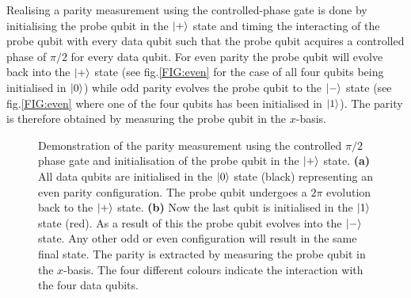 Realising a parity measurement using the controlled-phase gate is done by initialising the probe qubit in the $\ket{+}$ state and timing the interacting of the probe qubit with every data qubit such that the probe qubit acquires a controlled phase of $\pi/2$ for every data qubit. For even parity the probe qubit will evolve back into the $\ket{+}$ state (see fig.\@ \ref{FIG:even} for the case of all four qubits being initialised in $\ket{0}$) while odd parity evolves the probe qubit to the $\ket{-}$ state (see fig.\@ \ref{FIG:even} where one of the four qubits has been initialised in $\ket{1}$). The parity is therefore obtained by measuring the probe qubit in the $x$-basis.    


\begin{figure}[H]
	\caption[oddeven]{Demonstration of the parity measurement using the controlled  $\pi/2$ phase gate and initialisation of the probe qubit in the $\ket{+}$ state. \textbf{(a)} All data qubits are initialised in the $\ket{0}$ state (black) representing an even parity configuration. The probe qubit undergoes a $2\pi$ evolution back to  the $\ket{+}$ state. \textbf{(b)} Now the last qubit is initialised in the $\ket{1}$ state (red). As a result of this the probe qubit evolves into the $\ket{-}$ state. Any other odd or even configuration will result in the same final state. The parity is extracted by measuring the probe qubit in the $x$-basis. The four different colours indicate the interaction with the four data qubits.}
	\label{FIG:evolution}
\end{figure}


